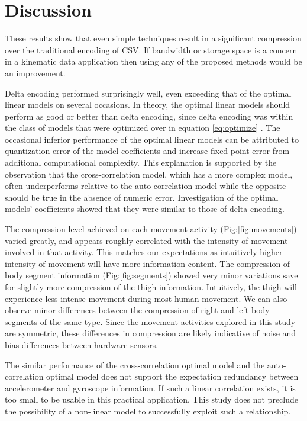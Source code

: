 \documentclass[journal]{IEEEtran}
\begin{document}
\begin{table}[htbp]
{\begin{tabular}{|l|r|r|r|r|r|r|r|r|r|r|r|r|}
\end{tabular}%
}%

\end{table}



\section{Discussion}

These results show that even simple techniques result in a significant compression over the traditional encoding of CSV. If bandwidth or storage space is a concern in a kinematic data application then using any of the proposed methods would be an improvement.

Delta encoding performed surprisingly well, even exceeding that of the optimal linear models on several occasions. In theory, the optimal linear models should perform as good or better than delta encoding, since delta encoding was within the class of models that were optimized over in equation \eqref{eq:optimize} . The occasional inferior performance of the optimal linear models can be attributed to quantization error of the model coefficients and increase fixed point error from additional computational complexity. This explanation is supported by the observation that the cross-correlation model, which has a more complex model, often underperforms relative to the auto-correlation model while the opposite should be true in the absence of numeric error. Investigation of the optimal models' coefficients showed that they were similar to those of delta encoding.

The compression level achieved on each movement activity (Fig:\ref{fig:movements}) varied greatly, and appears roughly correlated with the intensity of movement involved in that activity. This matches our expectations as intuitively higher intensity of movement will have more information content. The compression of body segment information (Fig:\ref{fig:segments}) showed very minor variations save for slightly more compression of the thigh information. Intuitively, the thigh will experience less intense movement during most human movement. We can also observe minor differences between the compression of right and left body segments of the same type. Since the movement activities explored in this study are symmetric, these differences in compression are likely indicative of noise and bias differences between hardware sensors.

The similar performance of the cross-correlation optimal model and the auto-correlation optimal model does not support the expectation redundancy between accelerometer and gyroscope information. If such a linear correlation exists, it is too small to be usable in this practical application. This study does not preclude the possibility of a non-linear model to successfully exploit such a relationship.
\end{document}
